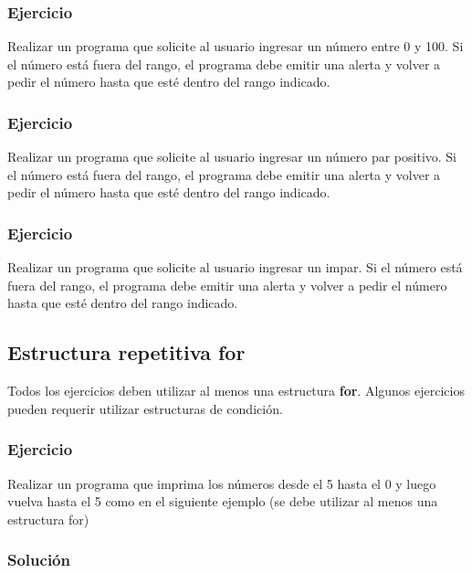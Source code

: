\subsubsection{Ejercicio}
Realizar un programa que solicite al usuario ingresar un número entre 0 y 100. Si el número está fuera del rango, el programa debe emitir una alerta y volver a pedir el número hasta que esté dentro del rango indicado.

\subsubsection{Ejercicio}
Realizar un programa que solicite al usuario ingresar un número par positivo. Si el número está fuera del rango, el programa debe emitir una alerta y volver a pedir el número hasta que esté dentro del rango indicado.

\subsubsection{Ejercicio}
Realizar un programa que solicite al usuario ingresar un impar. Si el número está fuera del rango, el programa debe emitir una alerta y volver a pedir el número hasta que esté dentro del rango indicado.

\subsection*{Estructura repetitiva for}
Todos los ejercicios deben utilizar al menos una estructura \textbf{for}.
Algunos ejercicios pueden requerir utilizar estructuras de condición.

\subsubsection{Ejercicio}
Realizar un programa que imprima los números desde el 5 hasta el 0 y luego vuelva hasta el 5 como en el siguiente ejemplo (se debe utilizar al menos una estructura for)

\subsubsection{Solución}

\lstset{inputencoding=utf8/latin1}

{\small
  \lstset{inputencoding=utf8/latin1}
  
}
